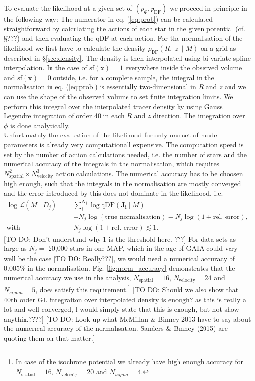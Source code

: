 \documentclass[12pt,preprint]{aastex}
\newcommand{\vect}[1]{\boldsymbol{#1}} %
\begin{document}
To evaluate the likelihood at a given set of $(p_\Phi,p_\text{DF})$ we proceed in principle in the following way: The numerator in eq. (\ref{eq:prob}) can be calculated straightforward by calculating the actions of each star in the given potential (cf. \S ???) and then evaluating the qDF at each action. For the normalisation of the likelihood we first have to calculate the density $\rho_\text{DF}(R,|z| \mid M)$ on a grid as described in \S\ref{sec:density}. The density is then interpolated using bi-variate spline interpolation. In the case of $\text{sf}(\vect{x})=1$ everywhere inside the observed volume and $\text{sf}(\vect{x})=0$ outside, i.e. for a complete sample, the integral in the normalisation in eq. (\ref{eq:prob}) is essentially two-dimensional in $R$ and $z$ and we can use the shape of the observed volume to set finite integration limits. We perform this integral over the interpolated tracer density by using Gauss Legendre integration of order 40 in each $R$ and $z$ direction. The integration over $\phi$ is done analytically.
\\Unfortunately the evaluation of the likelihood for only one set of model parameters is already very computationall expensive. The computation speed is set by the number of action calculations needed, i.e. the number of stars and the numerical accuracy of the integrals in the normalisation, which requires $N_\text{spatial}^2 \times N_\text{velocity}^3$ action calculations. The numerical accuracy has to be choosen high enough, such that the integrals in the normalisation are mostly converged and the error introduced by this does not dominate in the likelihood, i.e.
\begin{eqnarray}
\log \mathscr{L}(M \mid D_j) &=& \sum_i^{N_j} \log \text{qDF}(\vect{J_i} \mid M) \nonumber\\
& & -N_j \log(\text{true normalisation}) - N_j \log (1 + \text{rel. error}),\label{eq:relerrlikelihood}\\
 \text{with }  & &N_j \log (1 + \text{rel. error}) \lesssim 1.\nonumber
\end{eqnarray}
[TO DO: Don't understand why 1 is the threshold here. ???]
For data sets as large as $N_j =$ 20,000 stars in one MAP, which in the age of GAIA could very well be the case [TO DO: Really???], we would need a numerical accuracy of 0.005\% in the normalisation. Fig. \ref{fig:norm_accuracy} demonstrates that the numerical accuracy we use in the analysis, $N_\text{spatial}=16$, $N_\text{velocity}=24$ and $N_{sigma}=5$, does satisfy this requirement.\footnote{In case of the isochrone potential we already have high enough accuracy for $N_\text{spatial}=16$, $N_\text{velocity}=20$ and $N_{sigma}=4$.} [TO DO: Should we also show that 40th order GL integraiton over interpolated density is enough? as this is really a lot and well converged, I would simply state that this is enough, but not show anythin.????]
[TO DO: Look up what McMillan \& Binney 2013 have to say about the numerical accuracy of the normalisation. Sanders \& Binney (2015) are quoting them on that matter.]
\end{document}
